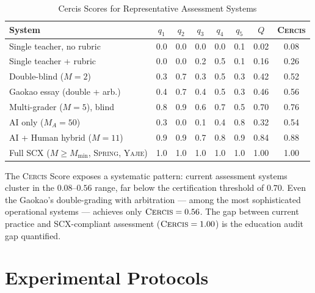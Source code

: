 \documentclass[11pt,a4paper]{article}
\theoremstyle{definition}
\theoremstyle{remark}
\newcommand{\SCX}{\textsc{SCX}}
\newcommand{\Yajie}{\textsc{Yajie}}
\newcommand{\Cercis}{\textsc{Cercis}}
\newcommand{\Spring}{\textsc{Spring}}
\begin{document}
\begin{table}[htbp]
\centering
\caption{Cercis Scores for Representative Assessment Systems}
\label{tab:cercis}
\begin{tabular}{p{3.5cm} c c c c c c c}
\toprule
\textbf{System } & $q_1$ & $q_2$ & $q_3$ & $q_4$ & $q_5$ & $Q$ & \textbf{\Cercis{}} \\
\midrule
Single teacher, no rubric & 0.0 & 0.0 & 0.0 & 0.0 & 0.1 & 0.02 & 0.08 \\
Single teacher + rubric & 0.0 & 0.0 & 0.2 & 0.5 & 0.1 & 0.16 & 0.26 \\
Double-blind ($M{=}2$) & 0.3 & 0.7 & 0.3 & 0.5 & 0.3 & 0.42 & 0.52 \\
Gaokao essay (double + arb.) & 0.4 & 0.7 & 0.4 & 0.5 & 0.3 & 0.46 & 0.56 \\
Multi-grader ($M{=}5$), blind & 0.8 & 0.9 & 0.6 & 0.7 & 0.5 & 0.70 & 0.76 \\
AI only ($M_A{=}50$) & 0.3 & 0.0 & 0.1 & 0.4 & 0.8 & 0.32 & 0.54 \\
AI + Human hybrid ($M{=}11$) & 0.9 & 0.9 & 0.7 & 0.8 & 0.9 & 0.84 & 0.88 \\
Full SCX ($M {\ge} M_{\min}$, \Spring{}, \Yajie{}) & 1.0 & 1.0 & 1.0 & 1.0 & 1.0 & 1.00 & 1.00 \\
\bottomrule
\end{tabular}
\end{table}
The \Cercis{} Score exposes a systematic pattern: current assessment systems cluster in the $0.08$--$0.56$ range, far below the certification threshold of $0.70$. Even the Gaokao's double-grading with arbitration — among the most sophisticated operational systems — achieves only $\Cercis = 0.56$. The gap between current practice and \SCX{}-compliant assessment ($\Cercis = 1.00$) is the education audit gap quantified.
\section{Experimental Protocols}
\label{sec:protocols}
\end{document}
